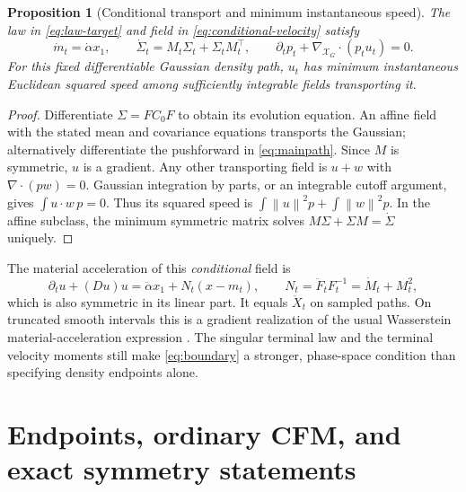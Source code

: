 \documentclass[11pt,letterpaper]{article}
\newcommand{\X}{\mathcal X_G}
\newcommand{\norm}[1]{\left\lVert#1\right\rVert}
\newtheorem{proposition}[theorem]{Proposition}
\begin{document}
\begin{proposition}[Conditional transport and minimum instantaneous speed]
The law in \eqref{eq:law-target} and field in \eqref{eq:conditional-velocity} satisfy
\begin{equation}
\dot m_t=\dot\alpha x_1,\qquad
\dot\Sigma_t=M_t\Sigma_t+\Sigma_tM_t^\top,\qquad
\partial_tp_t+\nabla_{\X}\cdot(p_tu_t)=0.
\label{eq:conditional-continuity}
\end{equation}
For this \emph{fixed} differentiable Gaussian density path, $u_t$ has minimum instantaneous Euclidean squared speed among sufficiently integrable fields transporting it.
\end{proposition}
\begin{proof}
Differentiate $\Sigma=FC_0F$ to obtain its evolution equation. An affine field with the stated mean and covariance equations transports the Gaussian; alternatively differentiate the pushforward in \eqref{eq:mainpath}. Since $M$ is symmetric, $u$ is a gradient. Any other transporting field is $u+w$ with $\nabla\cdot(pw)=0$. Gaussian integration by parts, or an integrable cutoff argument, gives $\int u\cdot w\,p=0$. Thus its squared speed is $\int\norm{u}^2p+\int\norm{w}^2p$. In the affine subclass, the minimum symmetric matrix solves $M\Sigma+\Sigma M=\dot\Sigma$ uniquely.
\end{proof}

The material acceleration of this \emph{conditional} field is
\begin{equation}
\partial_tu+(Du)u
=\ddot\alpha x_1+N_t(x-m_t),\qquad
N_t=\ddot F_tF_t^{-1}=\dot M_t+M_t^2,
\label{eq:material}
\end{equation}
which is also symmetric in its linear part. It equals $\ddot X_t$ on sampled paths. On truncated smooth intervals this is a gradient realization of the usual Wasserstein material-acceleration expression \cite{benamou}. The singular terminal law and the terminal velocity moments still make \eqref{eq:boundary} a stronger, phase-space condition than specifying density endpoints alone.

\section{Endpoints, ordinary CFM, and exact symmetry statements}
\label{sec:cfm}
\end{document}
